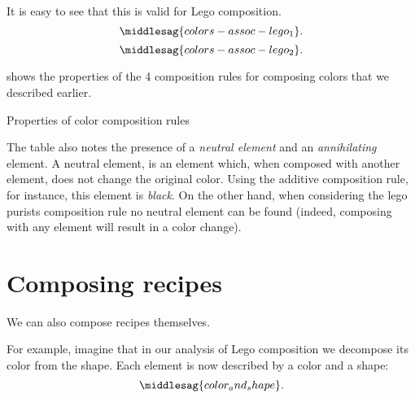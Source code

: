 It is easy to see that this is valid for Lego composition.
\begin{equation}
    \label{eq:colors-assoc-legoa}
    \middlesag{colors-assoc-lego_1}.
\end{equation}
\begin{equation}
    \label{eq:colors-assoc-legob}
    \middlesag{colors-assoc-lego_2}.
\end{equation}

 shows the properties of the 4 composition rules for composing colors that we described earlier.

\begin{table*}[p]
    \caption{Properties of color composition rules}
    \label{tab:color-properties}
\end{table*}

The table also notes the presence of a \emph{neutral element} and an \emph{annihilating} element.
A neutral element, is an element which, when composed with another element, does not change the original color.
Using the additive composition rule, for instance, this element is \emph{black}.
On the other hand, when considering the lego purists composition rule no neutral element can be found (indeed, composing with any element will result in a color change).


%

\section{Composing recipes}

We can also compose recipes themselves.

For example, imagine that in our analysis of Lego composition we decompose its color from the shape.
Each element is now described by a color and a shape:
%
\begin{equation}
    \label{eq:color-and-shape}
    \middlesag{color_and_shape}.
\end{equation}

